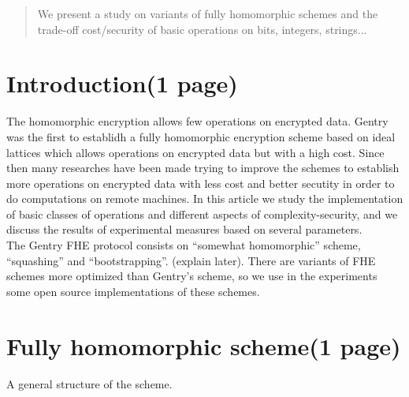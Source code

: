 \documentclass{acm_proc_article-sp}
\begin{document}

\date{30 July 1999}

\maketitle

\begin{abstract}
We present a study on variants of fully homomorphic schemes and the trade-off cost/security of basic operations on bits, integers, strings... 
\end{abstract}


\section{Introduction(1 page)}
The homomorphic encryption allows few operations on encrypted data. Gentry was the first to establidh a fully homomorphic encryption scheme based on ideal lattices which allows operations on encrypted data
 but with a high cost. Since then many researches have been made trying to improve the schemes to establish more operations on encrypted data with less cost and better secutity in order to do computations on remote machines. 
In this article we study the implementation of basic classes of operations and different aspects of 
complexity-security, and we discuss the results of experimental measures based on several parameters.\\
The Gentry FHE protocol consists on ``somewhat homomorphic'' scheme, ``squashing'' and ``bootstrapping''. (explain later). 
There are variants of FHE schemes more optimized than Gentry's scheme, so we use in the experiments some open source implementations of these schemes.
\section{Fully homomorphic scheme(1 page)}

A general structure of the scheme.
\end{document}
